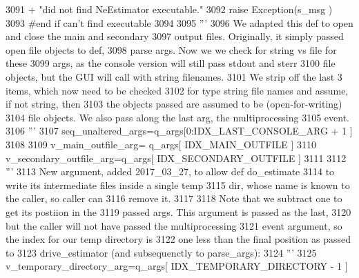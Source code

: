 \begin{DoxyCode}
3091                                 + \textcolor{stringliteral}{"did not find NeEstimator executable."} 
3092             \textcolor{keywordflow}{raise} Exception(s\_msg )
3093         \textcolor{comment}{#end if can't find executable}
3094         
3095         \textcolor{stringliteral}{'''}
3096 \textcolor{stringliteral}{        We adapted this def to open and close the main and secondary }
3097 \textcolor{stringliteral}{        output files. Originally, it simply passed open file objects to def,}
3098 \textcolor{stringliteral}{        parse args.  Now we we check for string vs file for these}
3099 \textcolor{stringliteral}{        args, as the console version will still pass stdout and sterr}
3100 \textcolor{stringliteral}{        file objects, but the GUI will call with string filenames.  }
3101 \textcolor{stringliteral}{        We strip off the last 3 items, which now need to be checked }
3102 \textcolor{stringliteral}{        for type string file names and assume, if not string, then }
3103 \textcolor{stringliteral}{        the objects passed are assumed to be (open-for-writing) }
3104 \textcolor{stringliteral}{        file objects.  We also pass along the last arg, the multiprocessing}
3105 \textcolor{stringliteral}{        event.  }
3106 \textcolor{stringliteral}{        '''}
3107         seq\_unaltered\_args=q\_args[0:IDX\_LAST\_CONSOLE\_ARG + 1 ]
3108 
3109         v\_main\_outfile\_arg= q\_args[ IDX\_MAIN\_OUTFILE ]
3110         v\_secondary\_outfile\_arg=q\_args[ IDX\_SECONDARY\_OUTFILE ]
3111 
3112         \textcolor{stringliteral}{'''}
3113 \textcolor{stringliteral}{        New argument, added 2017\_03\_27, to allow def do\_estimate}
3114 \textcolor{stringliteral}{        to write its intermediate files inside a single temp}
3115 \textcolor{stringliteral}{        dir, whose name is known to the caller, so caller can}
3116 \textcolor{stringliteral}{        remove it.  }
3117 \textcolor{stringliteral}{        }
3118 \textcolor{stringliteral}{        Note that we subtract one to get its postiion in the}
3119 \textcolor{stringliteral}{        passed args.  This argument is passed as the last,}
3120 \textcolor{stringliteral}{        but the caller will not have passed the multiprocessing}
3121 \textcolor{stringliteral}{        event argument, so the index for our temp directory is}
3122 \textcolor{stringliteral}{        one less than the final position as passed to }
3123 \textcolor{stringliteral}{        drive\_estimator (and subsequenctly to parse\_args):}
3124 \textcolor{stringliteral}{        '''}
3125         v\_temporary\_directory\_arg=q\_args[ IDX\_TEMPORARY\_DIRECTORY - 1 ]

\end{DoxyCode}
